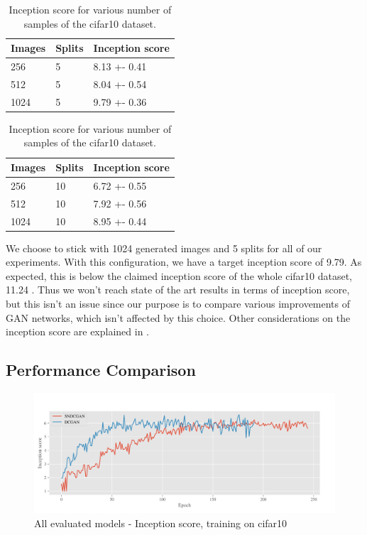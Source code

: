 \begin{table}[h]
\centering
\setlength{\tabcolsep}{0.5em} %

\begin{subtable}{.5\textwidth}
\centering

\begin{tabular}{l l l}
\toprule
Images & Splits & Inception score  \\ 
\midrule
      256  & 5 & 8.13 +- 0.41 \\   
      512  & 5 & 8.04 +- 0.54 \\ 
      1024 & 5 & 9.79 +- 0.36 \\
\bottomrule
\end{tabular}

\end{subtable}%
\begin{subtable}{.5\textwidth}
\centering

\begin{tabular}{l l l}
\toprule
Images & Splits & Inception score  \\ 
\midrule
      256  & 10 & 6.72 +- 0.55 \\   
      512  & 10 & 7.92 +- 0.56\\ 
      1024 & 10 & 8.95 +- 0.44 \\
\bottomrule
\end{tabular}
\end{subtable}%
%
\vspace{0.3cm}
\caption{Inception score for various number of samples of the cifar10 dataset.}
\label{table:exp-isc}
\end{table}%
We choose to stick with 1024 generated images and 5 splits for all of our experiments. With this configuration, we have a target inception score of 9.79. As expected, this is below the claimed inception score of the whole cifar10 dataset, 11.24 \cite{salimans2016improved}. Thus we won't reach state of the art results in terms of inception score, but this isn't an issue since our purpose is to compare various improvements of GAN networks, which isn't affected by this choice. Other considerations on the inception score are explained in \cite{barratt2018note}.







\subsection{Performance Comparison}

\begin{figure}[h]
\centering
\includegraphics[width=\textwidth]{../code/results/figures/all_cifar10_is.png}
\caption{All evaluated models - Inception score, training on cifar10}
\label{fig:exp-dcgan-is}
\end{figure}

